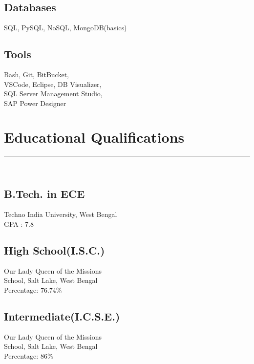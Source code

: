 \documentclass[]{rahulworld-resume}
\begin{document}
\begin{minipage}[t]{0.33\textwidth}
\subsection{Databases}
SQL, PySQL, NoSQL, MongoDB(basics)
\vspace{6pt}
\subsection{Tools}
Bash, Git, BitBucket,\\
VSCode, Eclipse, DB Visualizer,\\
SQL Server Management Studio,\\
SAP Power Designer
\sectionsep
\section{Educational Qualifications} 
\noindent\rule{5cm}{0.4pt}\\
\subsection{B.Tech. in ECE}
Techno India University, West Bengal \\
GPA : 7.8\\
\vspace{8pt}
\subsection{High School(I.S.C.)}
Our Lady Queen of the Missions\\
School, Salt Lake, West Bengal\\
Percentage: 76.74\%\\
\vspace{8pt}
\subsection{Intermediate(I.C.S.E.)}
Our Lady Queen of the Missions\\
School, Salt Lake, West Bengal\\
Percentage: 86\%
\sectionsep
%
%

\end{minipage} 
\hfill
\end{document}
